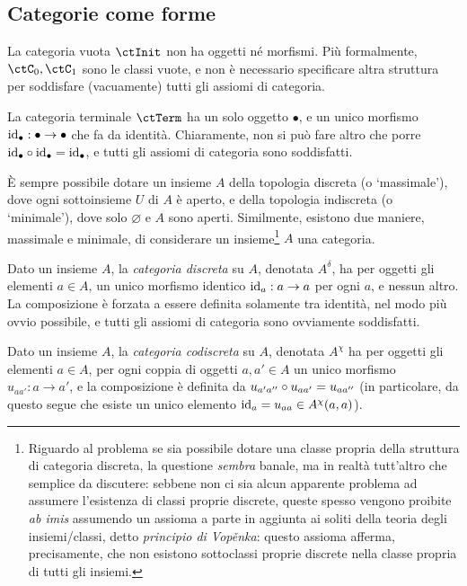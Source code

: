 \subsection{Categorie come forme}\label{ssec:categorie_forme}
\begin{example}\label{ex_cat_vuota}
	La categoria vuota \(\ctInit\) non ha oggetti né morfismi. Più formalmente, \(\ctC_0,\ctC_1\) sono le classi vuote, e non è necessario specificare altra struttura per soddisfare (vacuamente) tutti gli assiomi di categoria.
\end{example}
\begin{example}\label{ex_cat_term}
	La categoria terminale \(\ctTerm\) ha un solo oggetto \(\bullet\), e un unico morfismo \(\mathrm{id}_\bullet : \bullet\to\bullet\) che fa da identità. Chiaramente, non si può fare altro che porre \(\mathrm{id}_\bullet\circ\mathrm{id}_\bullet=\mathrm{id}_\bullet\), e tutti gli assiomi di categoria sono soddisfatti.
\end{example}
\`E sempre possibile dotare un insieme \(A\) della topologia discreta (o `massimale'), dove ogni sottoinsieme \(U\) di \(A\) è aperto, e della topologia indiscreta (o `minimale'), dove solo \(\varnothing\) e \(A\) sono aperti. Similmente, esistono due maniere, massimale e minimale, di considerare un insieme\footnote{Riguardo al problema se sia possibile dotare una classe propria della struttura di categoria discreta, la questione \emph{sembra} banale, ma in realtà tutt'altro che semplice da discutere: sebbene non ci sia alcun apparente problema ad assumere l'esistenza di classi proprie discrete, queste spesso vengono proibite \emph{ab imis} assumendo un assioma a parte in aggiunta ai soliti della teoria degli insiemi/classi, detto \emph{principio di Vop\v enka}: questo assioma afferma, precisamente, che non esistono sottoclassi proprie discrete nella classe propria di tutti gli insiemi.} \(A\) una categoria.
\begin{example}\label{ex_cat_discreta}
	Dato un insieme \(A\), la \emph{categoria discreta} su \(A\), denotata \(A^\delta\), ha per oggetti gli elementi \(a\in A\), un unico morfismo identico \(\mathrm{id}_a : a\to a\) per ogni \(a\), e nessun altro. La composizione è forzata a essere definita solamente tra identità, nel modo più ovvio possibile, e tutti gli assiomi di categoria sono ovviamente soddisfatti.
\end{example}
\begin{example}\label{ex_cat_codiscreta}
	Dato un insieme \(A\), la \emph{categoria codiscreta} su \(A\), denotata \(A^\chi\) ha per oggetti gli elementi \(a\in A\), per ogni coppia di oggetti \(a,a'\in A\) un unico morfismo \(u_{aa'}:a\to a'\), e la composizione è definita da \(u_{a'a''}\circ u_{aa'}=u_{aa''}\) (in particolare, da questo segue che esiste un unico elemento \(\mathrm{id}_a=u_{aa}\in A^\chi(a,a)\)).
\end{example}
